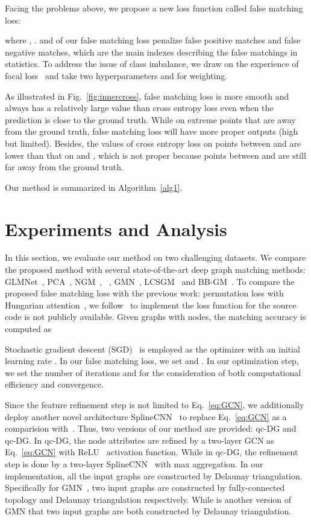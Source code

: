 \documentclass[final]{cvpr}
\begin{document}
Facing the problems above, we propose a new loss function called false matching loss:

where , .  and  of our false matching loss penalize false positive matches and false negative matches, which are the main indexes describing the false matchings in statistics. To address the issue of class imbalance, we draw on the experience of focal loss~\cite{lin2017focal} and take two hyperparameters  and  for weighting.

As illustrated in Fig.~\ref{fig:innercross}, false matching loss is more smooth and always has a relatively large value than cross entropy loss even when the prediction  is close to the ground truth. While on extreme points that are away from the ground truth, false matching loss will have more proper outputs (high but limited). Besides, the values of cross entropy loss on points between  and  are lower than that on  and , which is not proper because points between  and  are still far away from the ground truth.

Our method is summarized in Algorithm~\ref{alg1}.

\section{Experiments and Analysis}
In this section, we evaluate our method on two challenging datasets.
We compare the proposed method with several state-of-the-art deep graph matching methods:  GLMNet~\cite{jiang2019glmnet}, PCA~\cite{wang2019learning},  NGM~\cite{wang2019neural}, ~\cite{yu2020learning}, GMN~\cite{zanfir2018deep}, LCSGM~\cite{wang2020learning} and BB-GM~\cite{rolinek2020deep}. To compare the proposed false matching loss with the previous work: permutation loss with Hungarian attention~\cite{yu2020learning}, we follow~\cite{yu2020learning} to implement the loss function for the source code is not publicly available. Given graphs with  nodes, the matching accuracy is computed as


Stochastic gradient descent (SGD)~\cite{bottou2010large} is employed as the optimizer with an initial learning rate . In our false matching loss, we set  and . In our optimization step, we set the number of iterations  and  for the consideration of both computational efficiency and convergence.

Since the feature refinement step is not limited to Eq.~\eqref{eq:GCN}, we additionally deploy another novel architecture SplineCNN~\cite{fey2018splinecnn} to replace Eq.~\eqref{eq:GCN} as a comparision with~\cite{rolinek2020deep}. Thus, two versions of our method are provided: qc-DG and qc-DG. In qc-DG, the node attributes are refined by a two-layer GCN as Eq.~\eqref{eq:GCN} with ReLU~\cite{nair2010rectified} activation function. While in qc-DG, the refinement step is done by a two-layer SplineCNN~\cite{fey2018splinecnn} with max aggregation. In our implementation, all the input graphs are constructed by Delaunay
triangulation. Specifically for GMN~\cite{zanfir2018deep}, two input graphs are constructed by fully-connected topology and Delaunay triangulation respectively. While  is another version of GMN that two input graphs are both constructed by Delaunay triangulation.
\end{document}
